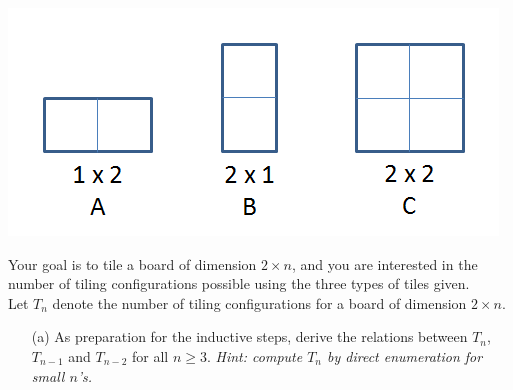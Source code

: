 \documentclass[11pt]{article}
\newif\ifsolutions
\begin{document}
\begin{qunlist}
\begin{minipage}{\linewidth}
\centering
\includegraphics[scale=0.6]{resources/figures/tile.png}
\end{minipage}

Your goal is to tile a board of dimension $2 \times n$, and you are interested in the number of
tiling configurations possible using the three types of tiles given. \\
Let $T_n$ denote the number of tiling configurations for a board of dimension $2 \times n$.
\begin{itemize}
\item[(a)] As preparation for the inductive steps, derive the relations between $T_n$, $T_{n-1}$ 
and $T_{n-2}$ for all $n \geq 3$. \textit{Hint: compute $T_n$ by direct enumeration for small $n$'s.}

\ifsolutions
\textbf{Solutions:} $T_n = T_{n-1} + 2T_{n-2}$ for all $n \geq 3$\\
We enumerate the tilings for a $2 \times n$ board by considering three cases depending on
the tile covering the bottom square of the first column. 
\begin{itemize}
\item[(i)] The tile is \textbf{A}: then the first two columns of the board must be tiled with \textbf{AA}.
The remaining $2 \times (n-2)$ board can be tiled in $T_{n-2}$ ways.
\item[(ii)] The tile is \textbf{B}: the first column is tiled with \textbf{A}, and
the remaining $2 \times (n-1)$ board can be tiled in $T_{n-1}$ ways.
\item[(iii)] The tile is \textbf{C}: the first two columns of the board are tiled with \textbf{C}, and
the remaining $2 \times (n-2)$ board can be tiled in $T_{n-2}$ ways.
\end{itemize}
Note that the three cases are exhaustive and mutually exclusive. The number of tilings for a $2 \times n$
board therefore satisfies the recurrence relation as proposed.
\fi



\end{itemize}
\end{qunlist}
\end{document}

